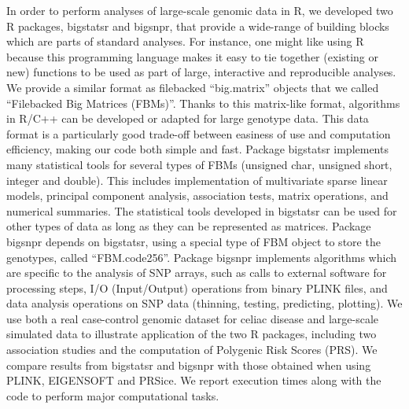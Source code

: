 \documentclass{bioinfo}
\begin{document}
{\color{red}
In order to perform analyses of large-scale genomic data in R, we developed two R packages, bigstatsr and bigsnpr, that provide a wide-range of building blocks which are parts of standard analyses. 
For instance, one might like using R because this programming language makes it easy to tie together (existing or new) functions to be used as part of large, interactive and reproducible analyses.
We provide a similar format as filebacked ``big.matrix'' objects that we called ``Filebacked Big Matrices (FBMs)''. Thanks to this matrix-like format, algorithms in R/C++ can be developed or adapted for large genotype data. This data format is a particularly good trade-off between easiness of use and computation efficiency, making our code both simple and fast.
}
Package bigstatsr implements many statistical tools for several types of FBMs (unsigned char, unsigned short, integer and double). This includes implementation of multivariate sparse linear models, principal component analysis, association tests, matrix operations, and numerical summaries. The statistical tools developed in bigstatsr can be used for other types of data as long as they can be represented as matrices. Package bigsnpr depends on bigstatsr, using a special type of FBM object to store the genotypes, called ``FBM.code256''. Package bigsnpr implements algorithms which are specific to the analysis of SNP arrays, such as calls to external software for processing steps, I/O (Input/Output) operations from binary PLINK files, and data analysis operations on SNP data (thinning, testing, predicting, plotting). 
We use both a real case-control genomic dataset for celiac disease and large-scale simulated data to illustrate application of the two R packages, including two association studies and the computation of Polygenic Risk Scores (PRS). We compare results from bigstatsr and bigsnpr with those obtained when using PLINK, EIGENSOFT and PRSice. We report execution times along with the code to perform major computational tasks.
\end{document}
